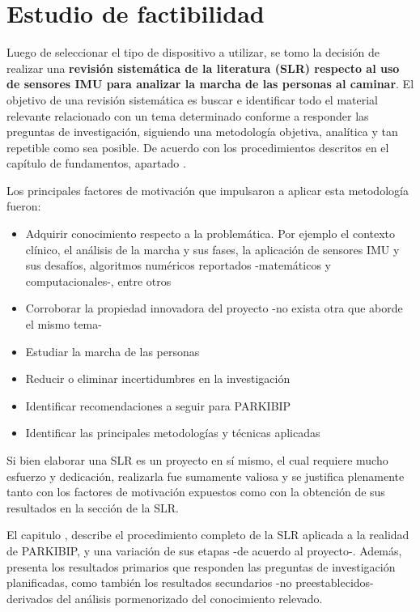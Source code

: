 \section{Estudio de factibilidad} %
Luego de seleccionar el tipo de dispositivo a utilizar, se tomo la decisión de realizar una \textbf{revisión sistemática de la literatura (SLR) respecto al uso de sensores IMU para analizar la marcha de las personas al caminar}. El objetivo de una revisión sistemática es buscar e identificar todo el material relevante relacionado con un tema determinado conforme a responder las preguntas de investigación, siguiendo una metodología objetiva, analítica y tan repetible como sea posible. De acuerdo con los procedimientos descritos en el capítulo de fundamentos, apartado .

Los principales factores de motivación que impulsaron a aplicar esta metodología fueron:

\begin{itemize}
    \item Adquirir conocimiento respecto a la problemática. Por ejemplo el contexto clínico, el análisis de la marcha y sus fases, la aplicación de sensores IMU y sus desafíos, algoritmos numéricos reportados -matemáticos y computacionales-, entre otros
    \item Corroborar la propiedad innovadora del proyecto -no exista otra que aborde el mismo tema-
    \item Estudiar la marcha de las personas 
    \item Reducir o eliminar incertidumbres en la investigación
    \item Identificar recomendaciones a seguir para PARKIBIP
    \item Identificar las principales metodologías y técnicas aplicadas
\end{itemize}

Si bien elaborar una SLR es un proyecto en sí  mismo, el cual requiere mucho esfuerzo y dedicación, realizarla fue sumamente valiosa y se justifica plenamente tanto con los factores de motivación expuestos como con la obtención de sus resultados en la sección  de la SLR.

El capitulo , describe el procedimiento completo de la SLR aplicada a la realidad de PARKIBIP, y una variación de sus etapas -de acuerdo al proyecto-. Además, presenta los resultados primarios que responden las preguntas de investigación planificadas, como también los resultados secundarios -no preestablecidos- derivados del análisis pormenorizado del conocimiento relevado.

